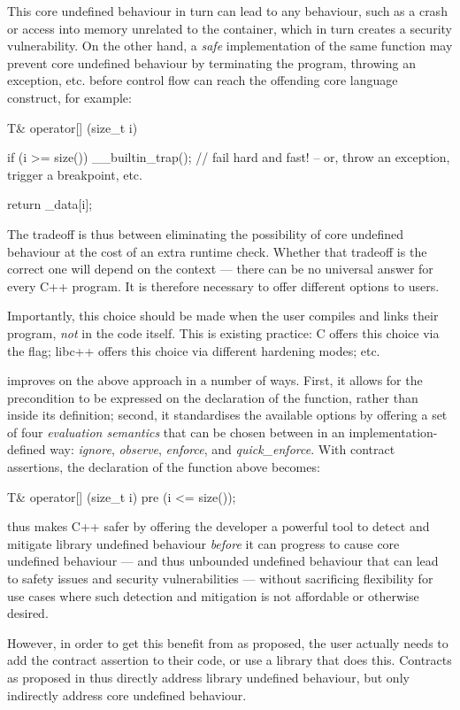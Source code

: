 This core undefined behaviour in turn can lead to any behaviour, such as a crash or access into memory unrelated to the container, which in turn creates a security vulnerability. On the other hand, a \emph{safe} implementation of the same function may prevent core undefined behaviour by terminating the program, throwing an exception, etc. before control flow can reach the offending core language construct, for example:
\begin{codeblock}
T& operator[] (size_t i) {
  if (i >= size())
    __builtin_trap(); // fail hard and fast! -- or, throw an exception, trigger a breakpoint, etc.
    
  return _data[i];
}
\end{codeblock}
The tradeoff is thus between eliminating the possibility of core undefined behaviour at the cost of an extra runtime check. Whether that tradeoff is the correct one will depend on the context --- there can be no universal answer for every C++ program. It is therefore necessary to offer different options to users.

Importantly, this choice should be made when the user compiles and links their program, \emph{not} in the code itself. This is existing practice: C  offers this choice via the  flag; libc++ offers this choice via different hardening modes; etc.

\cite{P2900R9} improves on the above approach in a number of ways. First, it allows for the precondition to be expressed on the declaration of the function, rather than inside its definition; second, it standardises the available options by offering a set of four \emph{evaluation semantics} that can be chosen between in an implementation-defined way: \emph{ignore}, \emph{observe}, \emph{enforce}, and \emph{quick_enforce}. With \cite{P2900R9} contract assertions, the declaration of the function above becomes:
\begin{codeblock}
T& operator[] (size_t i)
pre (i <= size());
\end{codeblock}
\cite{P2900R9} thus makes C++ safer by offering the developer a powerful tool to detect and mitigate library undefined behaviour \emph{before} it can progress to cause core undefined behaviour --- and thus unbounded undefined behaviour that can lead to safety issues and security vulnerabilities --- without sacrificing flexibility for use cases where such detection and mitigation is not affordable or otherwise desired.

However, in order to get this benefit from \cite{P2900R9} as proposed, the user actually needs to add the contract assertion  to their code, or use a library that does this. Contracts as proposed in \cite{P2900R9} thus directly address library undefined behaviour, but only indirectly address core undefined behaviour.

